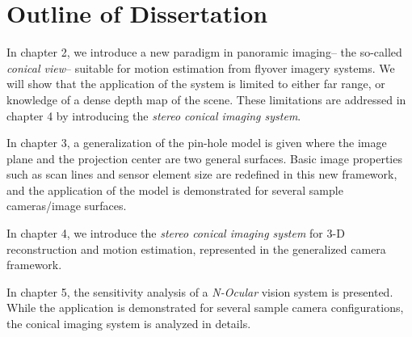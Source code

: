\ei

%

\section{Outline of Dissertation}


%

In chapter 2, we introduce a new paradigm in panoramic imaging-- the so-called \emph{conical
view}-- suitable for motion estimation from flyover imagery systems. We will show that the
application of the system is limited to either far range, or knowledge of a dense depth map of the
scene. These limitations are addressed in chapter 4 by introducing the \emph{stereo conical imaging
system}.

In chapter 3, a generalization of the pin-hole model is given where the image plane and the
projection center are two general surfaces. Basic image properties such as scan lines and sensor
element size are redefined in this new framework, and the application of the model is demonstrated
for several sample cameras/image surfaces.

In chapter 4, we introduce the \emph{stereo conical imaging system} for 3-D reconstruction and
motion estimation, represented in the generalized camera framework.

In chapter 5, the sensitivity analysis of a \emph{N-Ocular} vision system is presented. While the
application is demonstrated for several sample camera configurations, the conical imaging system is
analyzed in details.

